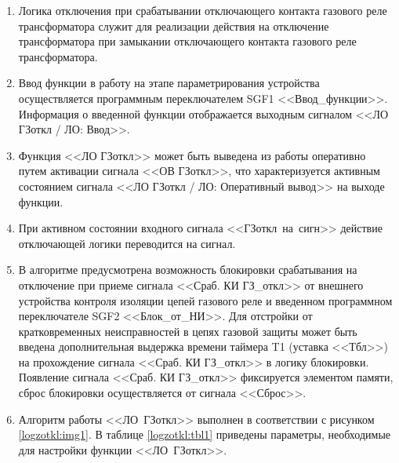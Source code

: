 \documentclass[a4paper, 12pt,table, hidelinks, DIV=calc]{extarticle} %
\begin{document}
\begin{enumerate}[label=\arabic{section}.\arabic{subsection}.\arabic*, labelsep=4pt, leftmargin=0pt, itemindent=57pt]

\item
Логика отключения при срабатывании отключающего контакта газового реле трансформатора служит для реализации действия на отключение трансформатора при замыкании отключающего контакта газового реле трансформатора.
\item
Ввод функции в работу на этапе параметрирования устройства осуществляется программным переключателем SGF1 <<Ввод\_функции>>. Информация о введенной функции отображается выходным сигналом <<ЛО ГЗоткл / ЛО: Ввод>>.
\item
Функция <<ЛО ГЗоткл>> может быть выведена из работы оперативно путем активации сигнала <<ОВ ГЗоткл>>, что характеризуется активным состоянием сигнала <<ЛО ГЗоткл / ЛО: Оперативный вывод>> на выходе функции. 
\item
При активном состоянии входного сигнала <<ГЗоткл~на~сигн>> действие отключающей логики переводится на сигнал.
\item
В алгоритме предусмотрена возможность блокировки срабатывания на отключение при приеме сигнала <<Сраб. КИ ГЗ\_откл>> от внешнего устройства контроля изоляции цепей газового реле и введенном программном переключателе SGF2 <<Блок\_от\_НИ>>. Для отстройки от кратковременных неисправностей в цепях газовой защиты может быть введена дополнительная выдержка времени таймера T1 (уставка <<Тбл>>) на прохождение сигнала <<Сраб. КИ ГЗ\_откл>> в логику блокировки. 
Появление сигнала <<Сраб. КИ ГЗ\_откл>> фиксируется элементом памяти, сброс блокировки осуществляется от сигнала <<Сброс>>.
\item
Алгоритм работы <<ЛО~ГЗоткл>> выполнен в соответствии с рисунком \ref{logzotkl:img1}. В таблице \ref{logzotkl:tbl1} приведены параметры, необходимые для настройки функции <<ЛО~ГЗоткл>>.


\end{enumerate}
\end{document}
